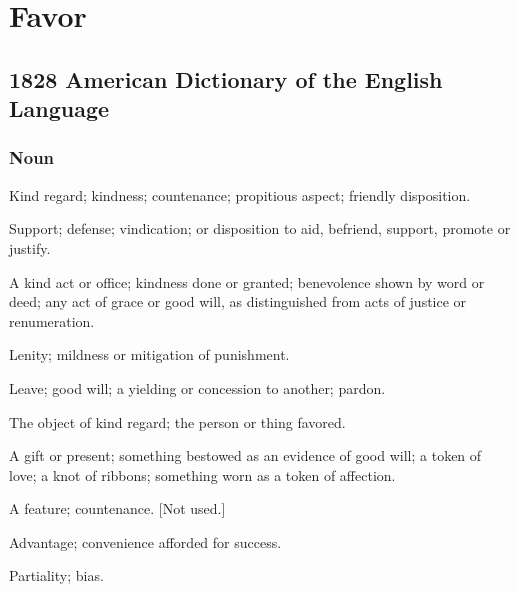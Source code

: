 \section{Favor}
	\label{FAVOR}
	

\subsection{1828 American Dictionary of the English Language} %
	\label{FAVOR-1828}
	
	\subsubsection{Noun}

		\begin{compactitem}
			\item[1] Kind regard; kindness; countenance; propitious aspect; friendly disposition.
			\item[2] Support; defense; vindication; or disposition to aid, befriend, support, promote or justify.
			\item[3] A kind act or office; kindness done or granted; benevolence shown by word or deed; any act of grace or good will, as distinguished from acts of justice or renumeration.
			\item[4] Lenity; mildness or mitigation of punishment.
			\item[5] Leave; good will; a yielding or concession to another; pardon.
			\item[6] The object of kind regard; the person or thing favored.
			\item[7] A gift or present; something bestowed as an evidence of good will; a token of love; a knot of ribbons; something worn as a token of affection.
			\item[8] A feature; countenance. [Not used.]
			\item[9] Advantage; convenience afforded for success.
			\item[10] Partiality; bias.
		\end{compactitem}
	
